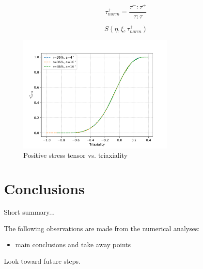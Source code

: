 \documentclass[sn-mathphys,Numbered,draft]{sn-jnl}%
\begin{document}
\begin{equation}
\label{eqn:normalisedTauPositive}
    \tau^+_{norm}=\frac{\tau^+ : \tau^+}{\tau : \tau}
\end{equation}

\begin{equation}
\label{eqn:alternativeLemaiterDenominator}
    S(\eta,\xi,\tau^+_{norm})
\end{equation}

\begin{figure}[htb]
\begin{center}
	\includegraphics[width=0.7\textwidth]{./Figures/SimulationAndAnalysis/compareCellData/tauTriaxCompare.png}
\caption{Positive stress tensor vs. triaxiality}
\label{fig:notchedRoundBAr}
\end{center}
\end{figure}




\section{Conclusions} \label{sec:conclusion}
Short summary...

The following observations are made from the numerical analyses:

\begin{itemize}
\item main conclusions and take away points
\end{itemize}

Look toward future steps.


\backmatter
\end{document}
